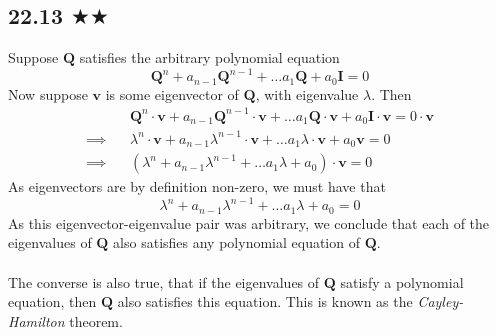 \subsection*{22.13 $\bigstar \bigstar$}
Suppose $\mathbf{Q}$ satisfies the arbitrary polynomial equation
$$\mathbf{Q}^n+a_{n-1}\mathbf{Q}^{n-1}+\ldots a_1\mathbf{Q}+a_0\mathbf{I}=0$$
Now suppose $\mathbf{v}$ is some eigenvector of $\mathbf{Q}$, with eigenvalue $\lambda$. Then
\begin{align*}
&\mathbf{Q}^n\cdot\mathbf{v}+a_{n-1}\mathbf{Q}^{n-1}\cdot\mathbf{v}+\ldots a_1\mathbf{Q}\cdot\mathbf{v}+a_0\mathbf{I}\cdot\mathbf{v}=0\cdot \mathbf{v} \\
\implies   \ \ \ \ &\lambda^n\cdot\mathbf{v}+a_{n-1}\lambda^{n-1}\cdot\mathbf{v}+\ldots a_1\lambda\cdot\mathbf{v}+a_0\mathbf{v}=0\\
\implies   \ \ \ \ &(\lambda^n+a_{n-1}\lambda^{n-1}+\ldots a_1\lambda+a_0)\cdot\mathbf{v}=0
\end{align*}
As eigenvectors are by definition non-zero, we must have that 
$$\lambda^n+a_{n-1}\lambda^{n-1}+\ldots a_1\lambda+a_0=0$$
As this eigenvector-eigenvalue pair was arbitrary, we conclude that each of the eigenvalues of $\mathbf{Q}$ also satisfies any polynomial equation of $\mathbf{Q}$. \\ \\ The converse is also true, that if the eigenvalues of $\mathbf{Q}$ satisfy a polynomial equation, then $\mathbf{Q}$ also satisfies this equation. This is known as the \emph{Cayley-Hamilton} theorem.
